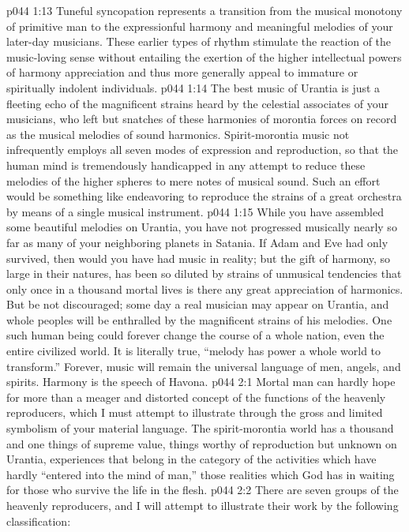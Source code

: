 \vs p044 1:13 Tuneful syncopation represents a transition from the musical monotony of primitive man to the expressionful harmony and meaningful melodies of your later\hyp{}day musicians. These earlier types of rhythm stimulate the reaction of the music\hyp{}loving sense without entailing the exertion of the higher intellectual powers of harmony appreciation and thus more generally appeal to immature or spiritually indolent individuals.
\pc \vs p044 1:14 The best music of Urantia is just a fleeting echo of the magnificent strains heard by the celestial associates of your musicians, who left but snatches of these harmonies of morontia forces on record as the musical melodies of sound harmonics. Spirit\hyp{}morontia music not infrequently employs all seven modes of expression and reproduction, so that the human mind is tremendously handicapped in any attempt to reduce these melodies of the higher spheres to mere notes of musical sound. Such an effort would be something like endeavoring to reproduce the strains of a great orchestra by means of a single musical instrument.
\vs p044 1:15 While you have assembled some beautiful melodies on Urantia, you have not progressed musically nearly so far as many of your neighboring planets in Satania. If Adam and Eve had only survived, then would you have had music in reality; but the gift of harmony, so large in their natures, has been so diluted by strains of unmusical tendencies that only once in a thousand mortal lives is there any great appreciation of harmonics. But be not discouraged; some day a real musician may appear on Urantia, and whole peoples will be enthralled by the magnificent strains of his melodies. One such human being could forever change the course of a whole nation, even the entire civilized world. It is literally true, “melody has power a whole world to transform.” Forever, music will remain the universal language of men, angels, and spirits. Harmony is the speech of Havona.
\vs p044 2:1 Mortal man can hardly hope for more than a meager and distorted concept of the functions of the heavenly reproducers, which I must attempt to illustrate through the gross and limited symbolism of your material language. The spirit\hyp{}morontia world has a thousand and one things of supreme value, things worthy of reproduction but unknown on Urantia, experiences that belong in the category of the activities which have hardly “entered into the mind of man,” those realities which God has in waiting for those who survive the life in the flesh.
\pc \vs p044 2:2 There are seven groups of the heavenly reproducers, and I will attempt to illustrate their work by the following classification:\plusone
